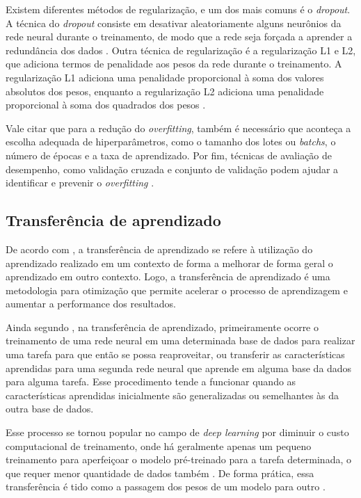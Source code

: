 Existem diferentes métodos de regularização, e um dos mais comuns é o \textit{dropout}. 
A técnica do \textit{dropout} consiste em desativar aleatoriamente alguns neurônios da rede neural durante o treinamento, de modo que a rede seja forçada a aprender a redundância dos dados \cite{srivastava2014}. 
Outra técnica de regularização é a regularização L1 e L2, que adiciona termos de penalidade aos pesos da rede durante o treinamento. 
A regularização L1 adiciona uma penalidade proporcional à soma dos valores absolutos dos pesos, enquanto a regularização L2 adiciona uma penalidade proporcional à soma dos quadrados dos pesos \cite{lecun1998gradient}.

Vale citar que para a redução do \textit{overfitting}, também é necessário que aconteça a escolha adequada de hiperparâmetros, como o tamanho dos lotes ou \textit{batchs}, o número de épocas e a taxa de aprendizado.
Por fim, técnicas de avaliação de desempenho, como validação cruzada e conjunto de validação podem ajudar a identificar e prevenir o \textit{overfitting} \cite{shortImageDeep}.

\subsection{Transferência de aprendizado}

De acordo com , a transferência de aprendizado se refere à utilização do aprendizado realizado em um contexto de forma a melhorar de forma geral o aprendizado em outro contexto.
Logo, a transferência de aprendizado é uma metodologia para otimização que permite acelerar o processo de aprendizagem e aumentar a performance dos resultados.

Ainda segundo , na transferência de aprendizado, primeiramente ocorre o treinamento de uma rede neural em uma determinada base de dados para realizar uma tarefa para que então se possa reaproveitar, ou transferir as características aprendidas para uma segunda rede neural que aprende em alguma base da dados para alguma tarefa. 
Esse procedimento tende a funcionar quando as características aprendidas inicialmente são generalizadas ou semelhantes às da outra base de dados.

Esse processo se tornou popular no campo de \textit{deep learning} por diminuir o custo computacional de treinamento, onde há geralmente apenas um pequeno treinamento para aperfeiçoar o modelo pré-treinado para a tarefa determinada, o que requer menor quantidade de dados também \cite{builtintl}. 
De forma prática, essa transferência é tido como a passagem dos pesos de um modelo para outro \cite{builtintl}. 


